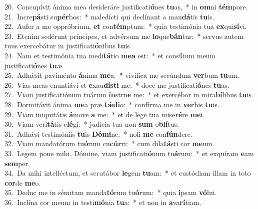 {20.~}Concupívit ánima mea desideráre justificati\textbf{ó}nes \textbf{tu}as,~* in \textbf{om}ni \textbf{tém}pore.\\
{21.~}Incre\textbf{pá}sti su\textbf{pér}bos:~* maledícti qui declínant a man\textbf{dá}tis \textbf{tu}is.\\
{22.~}Aufer a me oppróbrium, \textbf{et} con\textbf{tém}ptum:~* quia testimónia tua \textbf{ex}qui\textbf{sí}vi.\\
{23.~}Etenim sedérunt príncipes, et advérsum me \textbf{lo}que\textbf{bán}tur:~* servus autem tuus exercebátur in justificati\textbf{ó}nibus \textbf{tu}is.\\
{24.~}Nam et testimónia tua medi\textbf{tá}tio \textbf{me}\textbf{a} est:~* et consílium meum justificati\textbf{ó}nes \textbf{tu}æ.\\
{25.~}Adhǽsit paviménto \textbf{á}nima \textbf{me}a:~* vivífica me secúndum \textbf{ver}bum \textbf{tu}um.\\
{26.~}Vias meas enuntiávi et \textbf{e}xau\textbf{dí}\textbf{sti} me:~* doce me justificati\textbf{ó}nes \textbf{tu}as.\\
{27.~}Viam justificatiónum tuárum \textbf{ín}stru\textbf{e} me:~* et exercébor in mira\textbf{bí}libus \textbf{tu}is.\\
{28.~}Dormitávit ánima \textbf{me}a præ \textbf{tǽ}\textbf{di}o:~* confírma me in \textbf{ver}bis \textbf{tu}is.\\
{29.~}Viam iniquitátis \textbf{á}move \textbf{a} me:~* et de lege tua mise\textbf{ré}re \textbf{me}i.\\
{30.~}Viam veri\textbf{tá}tis e\textbf{lé}gi:~* judícia tua non \textbf{sum} o\textbf{blí}tus.\\
{31.~}Adhǽsi testimóniis \textbf{tu}is \textbf{Dó}\textbf{mi}ne:~* noli \textbf{me} con\textbf{fún}dere.\\
{32.~}Viam mandatórum tu\textbf{ó}rum cu\textbf{cúr}ri:~* cum dila\textbf{tá}sti cor \textbf{me}um.\\
{33.~}Legem pone mihi, Dómine, viam justificati\textbf{ó}num tu\textbf{á}rum:~* et exquíram \textbf{e}am \textbf{sem}per.\\
{34.~}Da mihi intelléctum, et scrutábor \textbf{le}gem \textbf{tu}am:~* et custódiam illam in toto \textbf{cor}de \textbf{me}o.\\
{35.~}Deduc me in sémitam manda\textbf{tó}rum tu\textbf{ó}rum:~* quia \textbf{i}psam \textbf{vó}lui.\\
{36.~}Inclína cor meum in testi\textbf{mó}nia \textbf{tu}a:~* et non in \textbf{a}va\textbf{rí}tiam.\\
